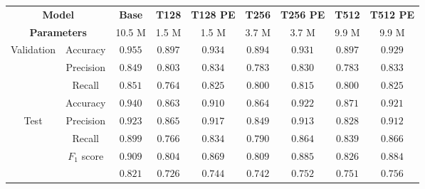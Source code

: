 \begin{tabular}{cc|ccccccc}
    \multicolumn{2}{c|}{\textbf{Model}} & \textbf{Base} & \textbf{T128} & \textbf{T128 PE} & \textbf{T256} & \textbf{T256 PE} & \textbf{T512} & \textbf{T512 PE}\\
    \multicolumn{2}{c|}{\textbf{Parameters}} & 10.5 M & 1.5 M & 1.5 M & 3.7 M & 3.7 M & 9.9 M & 9.9 M \\\hline
    \multirow{4}{*}{Validation} & Accuracy    & $\mathbf{0.955}$ & $0.897$ & $0.934$ & $0.894$ & $0.931$ & $0.897$ & $0.929$ \\
    & Precision   & $\mathbf{0.849}$ & $0.803$ & $0.834$ & $0.783$ & $0.830$ & $0.783$ & $0.833$ \\
    & Recall      & $\mathbf{0.851}$ & $0.764$ & $0.825$ & $0.800$ & $0.815$ & $0.800$ & $0.825$ \\
    & Accuracy    & $\mathbf{0.940}$ & $0.863$ & $0.910$ & $0.864$ & $0.922$ & $0.871$ & $0.921$ \\\hline
    \multirow{4}{*}{Test}       & Precision   & $\mathbf{0.923}$ & $0.865$ & $0.917$ & $0.849$ & $0.913$ & $0.828$ & $0.912$ \\
    & Recall      & $\mathbf{0.899}$ & $0.766$ & $0.834$ & $0.790$ & $0.864$ & $0.839$ & $0.866$ \\
    & $F_1$ score & $\mathbf{0.909}$ & $0.804$ & $0.869$ & $0.809$ & $0.885$ & $0.826$ & $0.884$ \\
    &             & $\mathbf{0.821}$ & $0.726$ & $0.744$ & $0.742$ & $0.752$ & $0.751$ & $0.756$ \\
\end{tabular}
